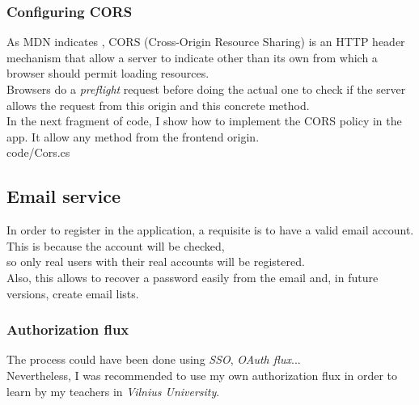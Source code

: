         \subsubsection{Configuring CORS}
            As MDN indicates \cite{CORS}, CORS (Cross-Origin Resource Sharing) is an HTTP header mechanism that allow a server to indicate other than its own from which a browser should permit loading resources. \\
            Browsers do a \textit{preflight} request before doing the actual one to check if the server allows the request from this origin and this concrete method. \\

            In the next fragment of code, I show how to implement the CORS policy in the app. It allow any method from the frontend origin. \\
            
            {code/Cors.cs}

    \subsection{Email service}
        In order to register in the application, a requisite is to have a valid email account. This is because the account will be checked, \\
        so only real users with their real accounts will be registered. \\

        Also, this allows to recover a password easily from the email and, in future versions, create email lists. \\

        \subsubsection{Authorization flux}
            The process could have been done using \textit{SSO}, \textit{OAuth flux}... \\
            Nevertheless, I was recommended to use my own authorization flux in order to learn by my teachers in \textit{Vilnius University}. \\

